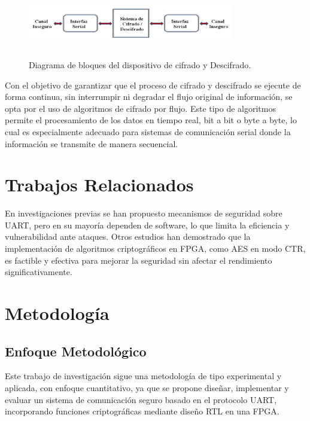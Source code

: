 \begin{figure}[h!] %
    \centering %
     \includegraphics[width=0.8\textwidth, height=3cm]{imagenes/img5} %
    \caption{Diagrama de bloques del dispositivo de cifrado y Descifrado.}
    \label{fig:imagen5} %
\end{figure} 

Con el objetivo de garantizar que el proceso de cifrado y descifrado se ejecute de forma continua, sin interrumpir ni degradar el flujo original de información, se opta por el uso de algoritmos de cifrado por flujo. Este tipo de algoritmos permite el procesamiento de los datos en tiempo real, bit a bit o byte a byte, lo cual es especialmente adecuado para sistemas de comunicación serial donde la información se transmite de manera secuencial.






\section{Trabajos Relacionados}
En investigaciones previas se han propuesto mecanismos de seguridad sobre UART, pero en su mayoría dependen de software, lo que limita la eficiencia y vulnerabilidad ante ataques. Otros estudios han demostrado que la implementación de algoritmos criptográficos en FPGA, como AES en modo CTR, es factible y efectiva para mejorar la seguridad sin afectar el rendimiento significativamente.



\section{Metodología}
\subsection{Enfoque Metodol\'ogico}

Este trabajo de investigación sigue una metodología de tipo experimental y aplicada, con enfoque cuantitativo, ya que se propone diseñar, implementar y evaluar un sistema de comunicación seguro basado en el protocolo UART, incorporando funciones criptográficas mediante diseño RTL en una FPGA.




